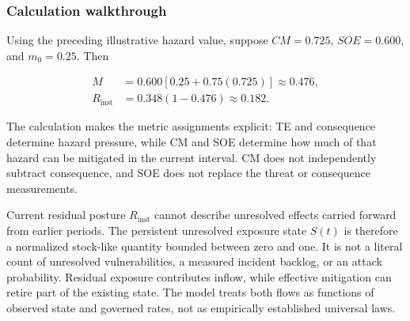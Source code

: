 \documentclass[11pt]{article}
\begin{document}
\subsubsection{Calculation walkthrough}
Using the preceding illustrative hazard value, suppose $CM=0.725$, $SOE=0.600$, and
$m_0=0.25$. Then

\begin{align}
  M&=0.600\left[0.25+0.75(0.725)\right]\approx0.476,\\
  R_{\mathrm{inst}}&=0.348(1-0.476)\approx0.182.
\end{align}

The calculation makes the metric assignments explicit: TE and consequence determine
hazard pressure, while CM and SOE determine how much of that hazard can be mitigated
in the current interval. CM does not independently subtract consequence, and SOE does
not replace the threat or consequence measurements.


Current residual posture $R_{\mathrm{inst}}$ cannot describe
unresolved effects carried forward from earlier periods. The
persistent unresolved exposure state $S(t)$ is therefore a normalized
stock-like quantity bounded between zero and one. It is not a literal
count of unresolved vulnerabilities, a measured incident backlog,
or an attack probability. Residual exposure contributes inflow,
while effective mitigation can retire part of the existing state.
The model treats both flows as functions of observed state and
governed rates, not as empirically established universal laws.
\end{document}
